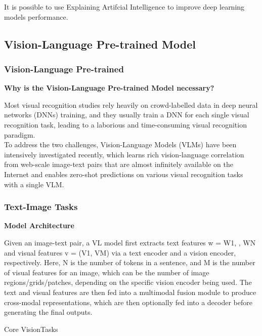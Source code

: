 It is possible to use Explaining Artifcial Intelligence to improve deep learning models performance.







\subsection{Vision-Language Pre-trained Model}
\subsubsection{Vision-Language Pre-trained}
\textbf{Why is the Vision-Language Pre-trained Model necessary?}

Most visual recognition studies rely heavily on crowd-labelled data in deep neural networks (DNNs) training, and they usually train a DNN for each single visual recognition task, leading to a laborious and time-consuming visual recognition paradigm.\\

To address the two challenges, Vision-Language Models (VLMs) have been intensively investigated recently, which learns rich vision-language correlation from web-scale image-text pairs that are almost infinitely available on the Internet and enables zero-shot predictions on various visual recognition tasks with a single VLM.

\subsubsection{Text-Image Tasks}
\textbf{Model Architecture}

Given an image-text pair, a VL model first extracts text features w = {W1, , WN} and visual features v = (V1, VM) via a text encoder and a vision encoder, respectively. Here, N is the number of tokens in a sentence, and M is the number of visual features for an image, which can be the number of image regions/grids/patches, depending on the specific vision encoder being used. The text and visual features are then fed into a multimodal fusion module to produce cross-modal representations, which are then optionally fed into a decoder before generating the final outputs.





Core VisionTasks








